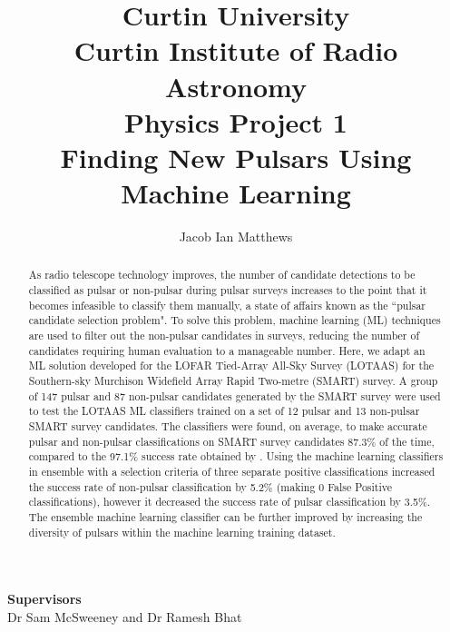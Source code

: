 \documentclass{article}
\title{\large{Curtin University} \\ \large{Curtin Institute of Radio Astronomy} \\ \large{Physics Project 1} \\ \vspace*{20px} \textbf{\LARGE{Finding New Pulsars Using Machine Learning}}\vspace*{10px}}
\author{\vspace*{20px} Jacob Ian Matthews}
\begin{document}
\begin{titlepage}
    
    \maketitle
    \thispagestyle{empty}
    
    \centering
    \textbf{Supervisors} \\\vspace*{5px}Dr Sam McSweeney and Dr Ramesh Bhat\\

    \vspace*{20px}

    \begin{abstract}

        As radio telescope technology improves, the number of candidate detections to be classified as pulsar or non-pulsar during pulsar surveys increases to the point that it becomes infeasible to classify them manually, a state of affairs known as the ``pulsar candidate selection problem". To solve this problem, machine learning (ML) techniques are used to filter out the non-pulsar candidates in surveys, reducing the number of candidates requiring human evaluation to a manageable number. Here, we adapt an ML solution developed for the LOFAR Tied-Array All-Sky Survey (LOTAAS) for the Southern-sky Murchison Widefield Array Rapid Two-metre (SMART) survey. A group of 147 pulsar and 87 non-pulsar candidates generated by the SMART survey were used to test the LOTAAS ML classifiers trained on a set of 12 pulsar and 13 non-pulsar SMART survey candidates. The classifiers were found, on average, to make accurate pulsar and non-pulsar classifications on SMART survey candidates 87.3\% of the time, compared to the 97.1\% success rate obtained by \textcite{lyon}. Using the machine learning classifiers in ensemble with a selection criteria of three separate positive classifications increased the success rate of non-pulsar classification by 5.2\% (making 0 False Positive classifications), however it decreased the success rate of pulsar classification by 3.5\%. The ensemble machine learning classifier can be further improved by increasing the diversity of pulsars within the machine learning training dataset.

    \end{abstract}



\end{titlepage}
\end{document}
